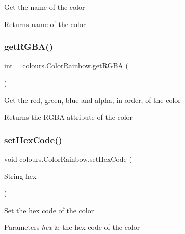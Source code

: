 Get the name of the color \begin{DoxyReturn}{Returns}
name of the color 
\end{DoxyReturn}
\mbox{\label{classcolours_1_1_color_rainbow_a5db769528ebfc07663a3581cdd547aae}} 
\subsubsection{\texorpdfstring{get\+R\+G\+B\+A()}{getRGBA()}}
{\footnotesize\ttfamily int \mbox{[}$\,$\mbox{]} colours.\+Color\+Rainbow.\+get\+R\+G\+BA (\begin{DoxyParamCaption}{ }\end{DoxyParamCaption})\hspace{0.3cm}{\ttfamily [inline]}}

Get the red, green, blue and alpha, in order, of the color \begin{DoxyReturn}{Returns}
the R\+G\+BA attribute of the color 
\end{DoxyReturn}
\mbox{\label{classcolours_1_1_color_rainbow_aaf06ae34e7cffbf90e25de191b815527}} 
\subsubsection{\texorpdfstring{set\+Hex\+Code()}{setHexCode()}}
{\footnotesize\ttfamily void colours.\+Color\+Rainbow.\+set\+Hex\+Code (\begin{DoxyParamCaption}\item[{String}]{hex }\end{DoxyParamCaption})\hspace{0.3cm}{\ttfamily [inline]}}

Set the hex code of the color 
\begin{DoxyParams}{Parameters}
{\em hex} & the hex code of the color \\
\hline
\end{DoxyParams}
\mbox{\label{classcolours_1_1_color_rainbow_a85293b45ccd52f616154c816284ef58d}} 

